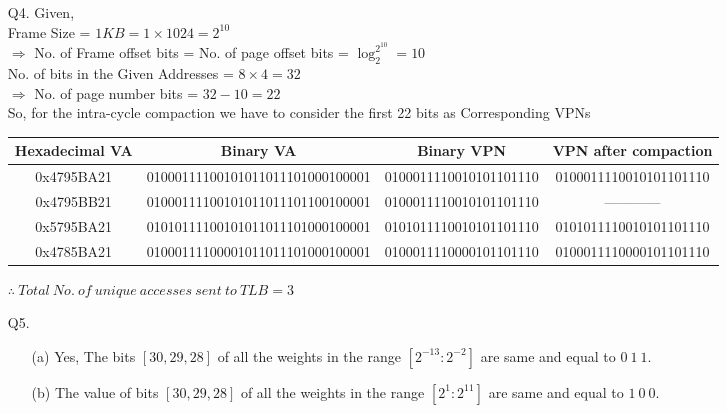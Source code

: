 \documentclass[letterpaper]{article}
\begin{document}
\begin{large}
\begin{flushleft}
\begin{enumerate}
\item[Q4. ]Given,\\[0.1in]
Frame Size = $1KB = 1 \times 1024 = 2^{10}$\\[0.1in]
$\Rightarrow$ No. of Frame offset bits = No. of page offset bits = $\log_2^{2^{10}}=10$\\[0.1in]
No. of bits in the Given Addresses = $8\times 4 = 32$\\[0.1in]
$\Rightarrow$ No. of page number bits = $32-10 = 22$\\[0.1in]
So, for the intra-cycle compaction we have to consider the first 22 bits as Corresponding VPNs\\[0.1in]
\begin{table}[h]
\flushright
\begin{tabular}{|c|c|c|c|}
\hline
\textbf{Hexadecimal VA} & \textbf{Binary VA} & \textbf{Binary VPN} & \textbf{VPN after compaction }\\
\hline
0x4795BA21 & 01000111100101011011101000100001 & 0100011110010101101110  &  0100011110010101101110\\
\hline
0x4795BB21 & 01000111100101011011101100100001 & 0100011110010101101110 & ------------\\
\hline
0x5795BA21 & 01010111100101011011101000100001 & 0101011110010101101110 & 0101011110010101101110\\
\hline
0x4785BA21 & 01000111100001011011101000100001 & 0100011110000101101110 & 0100011110000101101110 \\
\hline
\end{tabular}
\end{table}
$\boxed{\therefore\ Total\ No.\ of\ unique\ accesses\ sent\ to\ TLB = 3}$\\[0.3in]

\item[Q5. ]
\begin{enumerate}
\item[(a)]Yes, The bits $[30,29,28]$ of all the weights in the range $[2^{-13}:2^{-2}]$ are same and equal to $0\ 1\ 1$.\\[0.1in]
\item[(b)]The value of bits $[30,29,28]$ of all the weights in the range $[2^{1}:2^{11}]$ are same and equal to $1\ 0\ 0$.\\[0.2in]
\end{enumerate}


\end{enumerate}
\end{flushleft}
\end{large}
\end{document}
